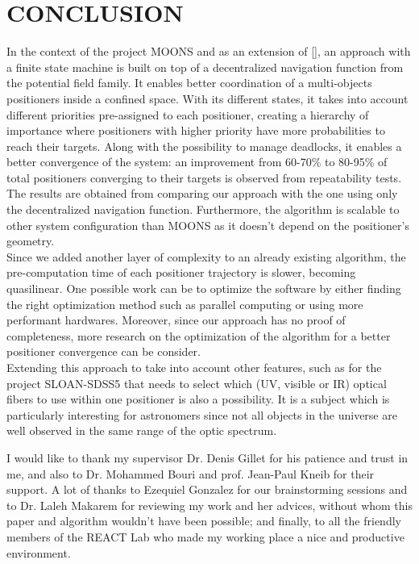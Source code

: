 \documentclass[]{spie}  %
\begin{document}
	\section{CONCLUSION}
	\label{CONCLUSION}
	In the context of the project MOONS and as an extension of [], an approach with a finite state machine is built on top of a decentralized navigation function from the potential field family. It enables better coordination of a multi-objects positioners inside a confined space. With its different states, it takes into account different priorities pre-assigned to each positioner, creating a hierarchy of importance where positioners with higher priority have more probabilities to reach their targets. Along with the possibility to manage deadlocks, it enables a better convergence of the system:
	 an improvement from  60-70\% to 80-95\% of total positioners converging to their targets is observed from repeatability tests. The results are obtained from comparing our approach with the one using only the decentralized navigation function. Furthermore, the algorithm is scalable to other system configuration than MOONS as it doesn't depend on the positioner's geometry.\\
	Since we added another layer of complexity to an already existing algorithm, the pre-computation time of each positioner trajectory is slower, becoming quasilinear. One possible work can be to optimize the software by either finding the right optimization method such as parallel computing or using more performant hardwares. Moreover, since our approach has no proof of completeness, more research on the optimization of the algorithm for a better positioner convergence can be consider.\\
	Extending this approach to take into account other features, such as for the project SLOAN-SDSS5 that needs to select which (UV, visible or IR) optical fibers to use within one positioner is also a possibility. It is a subject which is particularly interesting for astronomers since not all objects in the universe are well observed in the same range of the optic spectrum.
	
	\acknowledgments %
	
	I would like to thank my supervisor Dr. Denis Gillet for his patience and trust in me, and also to Dr. Mohammed Bouri and prof. Jean-Paul Kneib for their support. A lot of thanks to Ezequiel Gonzalez for our brainstorming sessions and to Dr. Laleh Makarem for reviewing my work and her advices, without whom this paper and algorithm wouldn't have been possible; and finally, to all the friendly members of the REACT Lab who made my working place a nice and productive environment. 
	

\end{document}
